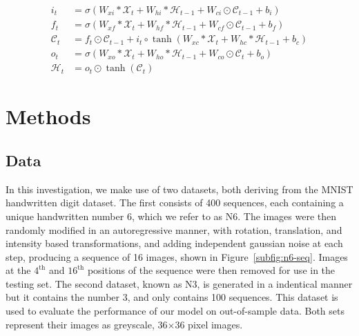 \documentclass[twocolumn]{article}
\begin{document}
\begin{equation}
    \begin{aligned}
    i_t &= \sigma(W_{xi}\ast \mathcal{X}_t + W_{hi}\ast \mathcal{H}_{t-1} + W_{ci}\odot \mathcal{C}_{t-1} + b_i) \\
    f_t &= \sigma(W_{xf}\ast \mathcal{X}_t + W_{hf}\ast \mathcal{H}_{t-1} + W_{cf}\odot \mathcal{C}_{t-1}+b_f) \\
    \mathcal{C}_t &= f_t \odot \mathcal{C}_{t-1} + i_t \circ \tanh(W_{xc} \ast \mathcal{X}_t + W_{hc} \ast \mathcal{H}_{t-1}+b_c) \\
    o_t &= \sigma(W_{xo}\ast \mathcal{X}_t + W_{ho}\ast \mathcal{H}_{t-1} + W_{co}\odot \mathcal{C}_{t}  +b_o) \\
    \mathcal{H}_t &= o_t \odot \tanh(\mathcal{C}_t)
    \end{aligned}
    \label{eq:convlstm}
\end{equation}

\section{Methods}

\subsection{Data}\label{sec:data}

In this investigation, we make use of two datasets, both deriving from the MNIST handwritten digit dataset. The first consists of 400 sequences, each containing a unique handwritten number 6, which we refer to as N6. The images were then randomly modified in an autoregressive manner, with rotation, translation, and intensity based transformations, and adding independent gaussian noise at each step, producing a sequence of 16 images, shown in Figure~\ref{subfig:n6-seq}. Images at the $4^\text{th}$ and $16^\text{th}$ positions of the sequence were then removed for use in the testing set. The second dataset, known as N3, is generated in a indentical manner but it contains the number 3, and only contains 100 sequences. This dataset is used to evaluate the performance of our model on out-of-sample data. Both sets represent their images as greyscale, 36$\times$36 pixel images. 
\end{document}

